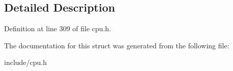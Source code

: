 \subsection{Detailed Description}


Definition at line 309 of file cpu.\-h.



The documentation for this struct was generated from the following file\-:\begin{DoxyCompactItemize}
\item 
include/cpu.\-h\end{DoxyCompactItemize}

